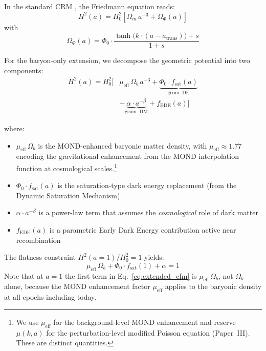 \documentclass[aps,prd,twocolumn,superscriptaddress,nofootinbib]{revtex4-2}
\begin{document}
In the standard CRM \cite{Geiger2026}, the Friedmann equation reads:
\begin{equation}
H^2(a) = H_0^2 \left[\Omega_m\,a^{-3} + \Omega_\Phi(a)\right]
\end{equation}
with
\begin{equation}
\Omega_\Phi(a) = \Phi_0 \cdot \frac{\tanh\!\big(k\cdot(a - a_{\mathrm{trans}})\big) + s}{1 + s}
\end{equation}

For the baryon-only extension, we decompose the geometric potential into two components:
\begin{equation}
\begin{split}
H^2(a) = H_0^2 \Big[&\mu_{\mathrm{eff}}\,\Omega_b\,a^{-3} + \underbrace{\Phi_0 \cdot f_{\mathrm{sat}}(a)}_{\text{geom.\ DE}} \\
&+ \underbrace{\alpha \cdot a^{-\beta}}_{\text{geom.\ DM}} + f_{\mathrm{EDE}}(a)\Big]
\end{split}
\label{eq:extended_cfm}
\end{equation}

where:
\begin{itemize}
\item $\mu_{\mathrm{eff}}\,\Omega_b$ is the MOND-enhanced baryonic matter density, with $\mu_{\mathrm{eff}} \approx 1.77$ encoding the gravitational enhancement from the MOND interpolation function at cosmological scales.\footnote{We use $\mu_{\mathrm{eff}}$ for the background-level MOND enhancement and reserve $\mu(k,a)$ for the perturbation-level modified Poisson equation (Paper~III). These are distinct quantities.}
\item $\Phi_0 \cdot f_{\mathrm{sat}}(a)$ is the saturation-type dark energy replacement (from the Dynamic Saturation Mechanism)
\item $\alpha \cdot a^{-\beta}$ is a power-law term that assumes the \textit{cosmological} role of dark matter
\item $f_{\mathrm{EDE}}(a)$ is a parametric Early Dark Energy contribution active near recombination
\end{itemize}

The flatness constraint $H^2(a{=}1)/H_0^2 = 1$ yields:
\begin{equation}
\mu_{\mathrm{eff}}\,\Omega_b + \Phi_0 \cdot f_{\mathrm{sat}}(1) + \alpha = 1
\end{equation}
Note that at $a=1$ the first term in Eq.~\eqref{eq:extended_cfm} is $\mu_{\mathrm{eff}}\,\Omega_b$, not $\Omega_b$ alone, because the MOND enhancement factor $\mu_{\mathrm{eff}}$ applies to the baryonic density at all epochs including today.
\end{document}

